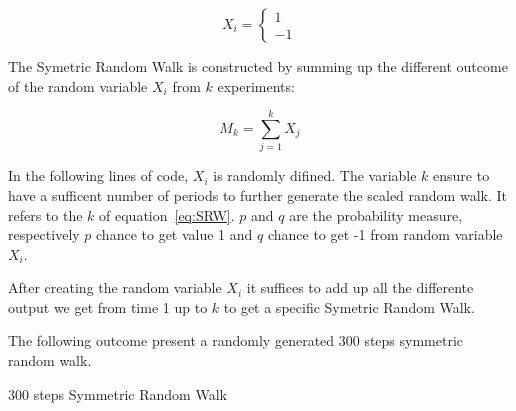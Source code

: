 \documentclass{article}\usepackage[]{graphicx}\usepackage[]{color}
\begin{document}
\begin{equation}
 \label{eq:Xi}
X_i = 
\left \{{
  \begin{array}{c} 1 \\ -1 \end{array}
  }\right .
\end{equation}
 
The Symetric Random Walk is constructed by summing up the different outcome of the random variable $X_i$ from $k$ experiments:

\begin{equation}
\label{eq:SRW}
M_k = 
\sum_{j=1}^k X_j
\end{equation}

In the following lines of code, $X_i$ is randomly difined. The variable $k$ ensure to have a sufficent number of periods to further generate the scaled random walk.
It refers to the $k$ of equation~\ref{eq:SRW}.
$p$ and $q$ are the probability measure, respectively $p$ chance to get value 1 and $q$ chance to get -1 from random variable $X_i$.

 


After creating the random variable $X_i$ it suffices to add up all the differente output we get from time 1 up to $k$ to get a specific Symetric Random Walk.

The following outcome present a randomly generated 300 steps symmetric random walk.

\begin{table}[h]

\caption{300 steps Symmetric Random Walk}
\end{table}
\end{document}
